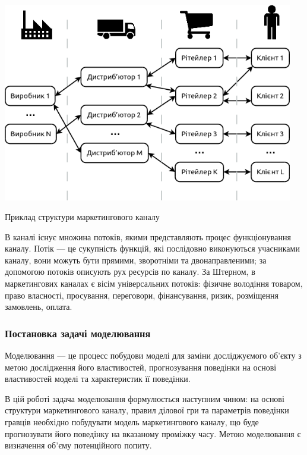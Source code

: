             \begin{stdfigure}
                \includegraphics[width=5in]{images/channel_structure.png}
                \caption{Приклад структури маркетингового каналу}
                \label{fig:channel_structure}
            \end{stdfigure}    

В каналі існує множина потоків, якими представляють процес функціонування каналу. Потік --- це сукупність функцій, які послідовно виконуються учасниками каналу, вони можуть бути прямими, зворотніми та двонаправленими; за допомогою потоків описують рух ресурсів по каналу. За Штерном, в маркетингових каналах є вісім універсальних потоків\cite{stern}: фізичне володіння товаром, право власності, просування, переговори, фінансування, ризик, розміщення замовлень, оплата.

    \subsubsection{Постановка задачі моделювання}

Моделювання --- це процесс побудови моделі для заміни досліджуємого об’єкту з метою дослідження його властивостей, прогнозування поведінки на основі властивостей моделі та характеристик її поведінки\cite{model}.
 
В цій роботі задача моделювання формулюється наступним чином: на основі структури маркетингового каналу, правил ділової гри та параметрів поведінки гравців необхідно побудувати модель маркетингового каналу, що буде прогнозувати його поведінку на вказаному проміжку часу. Метою моделювання є визначення об'єму потенційного попиту.


